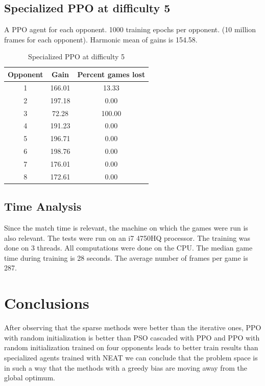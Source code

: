 \documentclass[conference]{IEEEtran}
\begin{document}
    \subsection{Specialized PPO at difficulty 5}\label{subsec:specialized-ppo-at-difficulty-5}
    A PPO agent for each opponent.
    1000 training epochs per opponent.
    (10 million frames for each opponent).
    Harmonic mean of gains is 154.58.
    \begin{table}[htbp]
        \caption{Specialized PPO at difficulty 5}
        \begin{center}
            \begin{tabular}{|c|c|c|}
                \hline
                \textbf{Opponent}&\textbf{Gain}&\textbf{Percent games lost}\\
                \hline
                 1 &  166.01 &   13.33\\
                 2 &  197.18 &    0.00\\
                 3 &   72.28 &  100.00\\
                 4 &  191.23 &    0.00\\
                 5 &  196.71 &    0.00\\
                 6 &  198.76 &    0.00\\
                 7 &  176.01 &    0.00\\
                 8 &  172.61 &    0.00\\
                \hline
            \end{tabular}
            \label{PPO generalized at difficulty 5}
        \end{center}
    \end{table}

    \subsection{Time Analysis}\label{subsec:time-analysis}
    Since the match time is relevant, the machine on which the games were run is also relevant.
    The tests were run on an i7 4750HQ processor.
    The training was done on 3 threads.
    All computations were done on the CPU\@.
    The median game time during training is 28 seconds.
    The average number of frames per game is 287.

    \section{Conclusions}\label{sec:conclusions}
    After observing that the sparse methods were better than the iterative ones,
    PPO with random initialization is better than PSO cascaded with PPO and
    PPO with random initialization trained on four opponents leads to better train results
    than specialized agents trained with NEAT we can conclude that the problem space is in such a
    way that the methods with a greedy bias are moving away from the global optimum.
\end{document}
